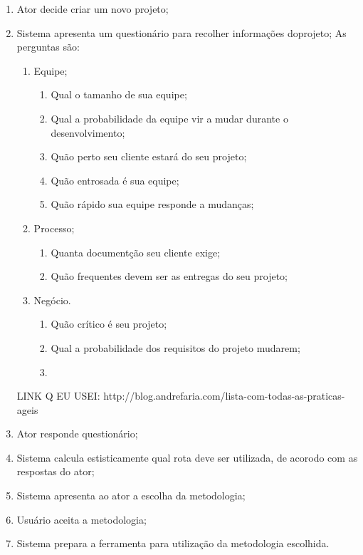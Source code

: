 	\begin{enumerate}
		\item Ator decide criar um novo projeto;
		\item Sistema apresenta um questionário para recolher informações doprojeto;
			As perguntas são:
			\begin{enumerate}
				\item Equipe;
					\begin{enumerate}
						\item Qual o tamanho de sua equipe;
						\item Qual a probabilidade da equipe vir a mudar durante o desenvolvimento;
						\item Quão perto seu cliente estará do seu projeto;
						\item Quão entrosada é sua equipe;
						\item Quão rápido sua equipe responde a mudanças;
					\end{enumerate}
				\item Processo;
					\begin{enumerate}
						\item Quanta documentção seu cliente exige;
						\item Quão frequentes devem ser as entregas do seu projeto;

					\end{enumerate}
				\item Negócio.
					\begin{enumerate}
						\item Quão crítico é seu projeto;
						\item Qual a probabilidade dos requisitos do projeto mudarem;
						\item 
					\end{enumerate}
			\end{enumerate}
			LINK Q EU USEI: http://blog.andrefaria.com/lista-com-todas-as-praticas-ageis
		\item Ator responde questionário;
		\item Sistema calcula estisticamente qual rota deve ser utilizada, de acorodo com as respostas do ator;
			\label{item:1.3.1.1_empate}
		\item Sistema apresenta ao ator a escolha da metodologia;
		\item Usuário aceita a metodologia;
			\label{item:1.3.1.1_recusado}
		\item Sistema prepara a ferramenta para utilização da metodologia escolhida.
			\label{item:1.3.1.1_retorno1}
	\end{enumerate}

